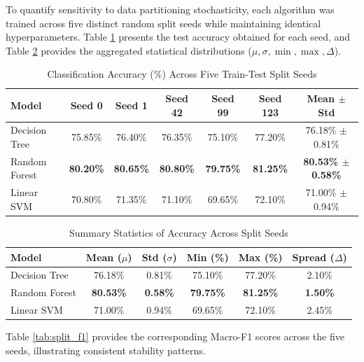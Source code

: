 To quantify sensitivity to data partitioning stochasticity, each algorithm was trained across five distinct random split seeds while maintaining identical hyperparameters. Table \ref{tab:split_accuracy} presents the test accuracy obtained for each seed, and Table \ref{tab:split_stats} provides the aggregated statistical distributions ($\mu, \sigma, \min, \max, \Delta$).

\begin{table}[H]
\centering
\caption{Classification Accuracy (\%) Across Five Train-Test Split Seeds}
\label{tab:split_accuracy}
\begin{tabular}{lcccccc}
\toprule
\textbf{Model} & \textbf{Seed 0} & \textbf{Seed 1} & \textbf{Seed 42} & \textbf{Seed 99} & \textbf{Seed 123} & \textbf{Mean $\pm$ Std} \\
\midrule
Decision Tree & 75.85\% & 76.40\% & 76.35\% & 75.10\% & 77.20\% & 76.18\% $\pm$ 0.81\% \\
Random Forest & \textbf{80.20\%} & \textbf{80.65\%} & \textbf{80.80\%} & \textbf{79.75\%} & \textbf{81.25\%} & \textbf{80.53\% $\pm$ 0.58\%} \\
Linear SVM & 70.80\% & 71.35\% & 71.10\% & 69.65\% & 72.10\% & 71.00\% $\pm$ 0.94\% \\
\bottomrule
\end{tabular}
\end{table}

\begin{table}[H]
\centering
\caption{Summary Statistics of Accuracy Across Split Seeds}
\label{tab:split_stats}
\begin{tabular}{lccccc}
\toprule
\textbf{Model} & \textbf{Mean ($\mu$)} & \textbf{Std ($\sigma$)} & \textbf{Min (\%)} & \textbf{Max (\%)} & \textbf{Spread ($\Delta$)} \\
\midrule
Decision Tree & 76.18\% & 0.81\% & 75.10\% & 77.20\% & 2.10\% \\
Random Forest & \textbf{80.53\%} & \textbf{0.58\%} & \textbf{79.75\%} & \textbf{81.25\%} & \textbf{1.50\%} \\
Linear SVM & 71.00\% & 0.94\% & 69.65\% & 72.10\% & 2.45\% \\
\bottomrule
\end{tabular}
\end{table}

Table \ref{tab:split_f1} provides the corresponding Macro-F1 scores across the five seeds, illustrating consistent stability patterns.

